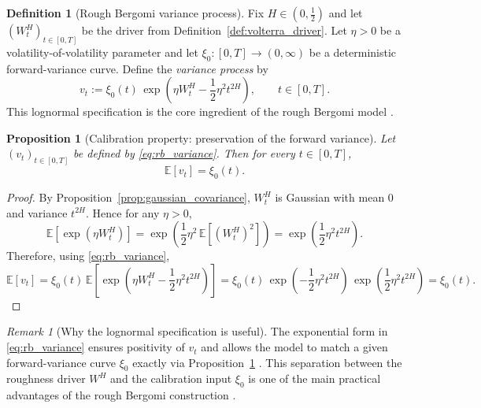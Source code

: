 \documentclass[12pt,a4paper]{article}
\theoremstyle{definition}
\newtheorem{definition}{Definition}[section]
\theoremstyle{plain}
\newtheorem{proposition}{Proposition}[section]
\theoremstyle{remark}
\newtheorem{remark}{Remark}[section]
\theoremstyle{plain}
\begin{document}
\begin{definition}[Rough Bergomi variance process]
\label{def:rough_bergomi_variance}
Fix $H\in(0,\tfrac12)$ and let $(W^H_t)_{t\in[0,T]}$ be the driver from Definition~\ref{def:volterra_driver}. 
Let $\eta>0$ be a volatility-of-volatility parameter and let $\xi_0:[0,T]\to(0,\infty)$ be a deterministic forward-variance curve. 
Define the \emph{variance process} by
\begin{equation}
\label{eq:rb_variance}
    v_t
    :=
    \xi_0(t)\,
    \exp\!\left(
        \eta W^H_t - \frac12 \eta^2 t^{2H}
    \right),
    \qquad t\in[0,T].
\end{equation}
This lognormal specification is the core ingredient of the rough Bergomi model \cite{BayerFriz2016}.
\end{definition}

\begin{proposition}[Calibration property: preservation of the forward variance]
\label{prop:forward_variance_preserved}
Let $(v_t)_{t\in[0,T]}$ be defined by \eqref{eq:rb_variance}. Then for every $t\in[0,T]$,
\[
    \mathbb E[v_t] = \xi_0(t).
\]
\end{proposition}

\begin{proof}
By Proposition~\ref{prop:gaussian_covariance}, $W^H_t$ is Gaussian with mean $0$ and variance $t^{2H}$. Hence for any $\eta>0$,
\[
    \mathbb E\!\left[\exp(\eta W^H_t)\right]
    =
    \exp\!\left(\frac12 \eta^2\,\mathbb E[(W^H_t)^2]\right)
    =
    \exp\!\left(\frac12 \eta^2 t^{2H}\right).
\]
Therefore, using \eqref{eq:rb_variance},
\[
    \mathbb E[v_t]
    =
    \xi_0(t)\,
    \mathbb E\!\left[
        \exp\!\left(\eta W^H_t - \frac12 \eta^2 t^{2H}\right)
    \right]
    =
    \xi_0(t)\,
    \exp\!\left(-\frac12 \eta^2 t^{2H}\right)\,
    \exp\!\left(\frac12 \eta^2 t^{2H}\right)
    =
    \xi_0(t).
\]
\end{proof}

\begin{remark}[Why the lognormal specification is useful]
\label{rem:lognormal_useful}
The exponential form in \eqref{eq:rb_variance} ensures positivity of $v_t$ and allows the model to match a given forward-variance curve $\xi_0$ exactly via Proposition~\ref{prop:forward_variance_preserved} \cite{BayerFriz2016}. 
This separation between the roughness driver $W^H$ and the calibration input $\xi_0$ is one of the main practical advantages of the rough Bergomi construction \cite{BayerFriz2016,RoughSurvey}.
\end{remark}
\end{document}
